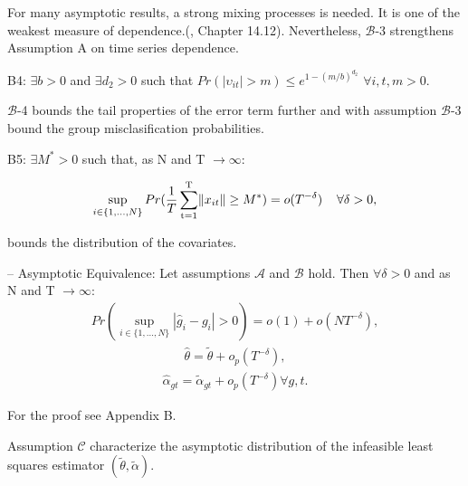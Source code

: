 For many asymptotic results, a strong mixing processes is needed. It is one of the weakest measure of dependence.(\cite{hansen2022econometrics}, Chapter 14.12). Nevertheless, $\mathcal{B}$-3 strengthens Assumption A on time series dependence.

\begin{assumption} B4: $\exists b>0$ and  $\exists d_2 > 0$ such that $Pr(|\upsilon_{it}| > m) \leq e^{1-(m/b)^{d_2}}$ $\forall i,t, m > 0$.
\end{assumption}
$\mathcal{B}$-4 bounds the tail properties of the error term further and with assumption $\mathcal{B}$-3 bound the  group misclasification probabilities.
\begin{assumption} B5: $\exists M^*>0$ such that, as N and T $\rightarrow \infty$:

\begin{align*}
    \sup_{i \in \{1,...,N\}} Pr(\dfrac{1}{T} \operatorname*{\sum_{t=1}^T} \lVert x_{it} \rVert \geq M^*) = o(T^{-\delta}) \hspace{0.4cm} \forall \delta > 0,
\end{align*}
\end{assumption}
bounds the distribution of the covariates.

\begin{theorem} -- Asymptotic Equivalence: Let assumptions $\mathcal{A}$ and $\mathcal{B}$ hold. Then $\forall \delta > 0$ and as N and T $\rightarrow \infty$:
\begin{align}
Pr( \sup_{i \in \{1,...,N\}} |\hat g_i - g_i| > 0) = o(1) + o(NT^{-\delta}), 
\end{align}
\begin{align}
\hat{\theta} = \tilde{\theta} + o_p(T^{-\delta}),
\end{align}
\begin{align}
\hat\alpha_{gt} = \tilde{\alpha}_{gt} + o_p(T^{-\delta}) \forall g,t.
\end{align}
\end{theorem}
For the proof see \textcite{bonhomme2015grouped} Appendix B.

Assumption $\mathcal{C}$ characterize the asymptotic distribution of the infeasible least squares estimator $(\tilde{\theta}, \tilde{\alpha})$.

